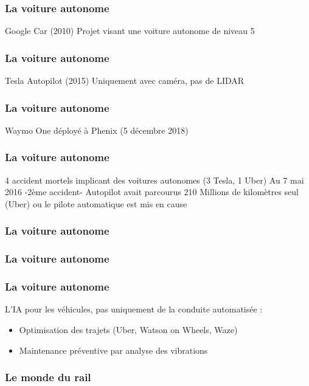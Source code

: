 \documentclass{formation}
\begin{document}
\begin{frame}
  \frametitle{La voiture autonome}
  Google Car (2010)
  \newline
  Projet visant une voiture autonome de niveau 5
\end{frame}

\begin{frame}
  \frametitle{La voiture autonome}
  Tesla Autopilot (2015)
  \newline
  Uniquement avec caméra, pas de LIDAR
  \newline
\end{frame}

\begin{frame}
  \frametitle{La voiture autonome}
  Waymo One déployé à Phenix (5 décembre 2018)
\end{frame}

\begin{frame}
  \frametitle{La voiture autonome}
  4 accident mortels implicant des voitures autonomes (3 Tesla, 1 Uber)
  \newline
  Au 7 mai 2016 -2ème accident- Autopilot avait parcourus 210 Millions de kilomètres
   seul (Uber) ou le pilote automatique est mis en cause
\end{frame}

\begin{frame}
  \frametitle{La voiture autonome}
\end{frame}

\begin{frame}
  \frametitle{La voiture autonome}
\end{frame}

\begin{frame}
  \frametitle{La voiture autonome}
  L'IA pour les véhicules, pas uniquement de la conduite automatisée :
  \begin{itemize}
  \item Optimisation des trajets (Uber, Watson on Wheels, Waze)
  \item Maintenance préventive par analyse des vibrations
  \end{itemize}
\end{frame}

\begin{frame}
  \frametitle{Le monde du rail}
\end{frame}
\end{document}

